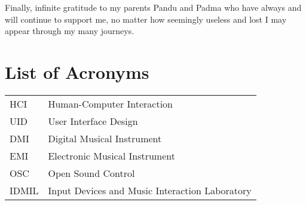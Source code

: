 \documentclass [12pt,letterpaper]{report}
\begin{document}
Finally, infinite gratitude to my parents Pandu and Padma who have always and will continue to support me, no matter how seemingly useless and lost I may appear through my many journeys.

\tableofcontents
\listoffigures
\listoftables

\newpage
\chapter*{List of Acronyms}

\begin{longtable}{ll}
  HCI		&	Human-Computer Interaction\\
  UID		&	User Interface Design\\
  DMI		&	Digital Musical Instrument\\
  EMI		&	Electronic Musical Instrument\\
  OSC	&	Open Sound Control\\
  IDMIL	&	Input Devices and Music Interaction Laboratory\\
\end{longtable}

\cleardoublepage
{}

\typeout{}


\typeout{}


\typeout{}


\typeout{}


\typeout{}


\appendix



\begin{comment}
\typeout{}

\end{comment}

\typeout{}
\begin{singlespace}
  
  
\end{singlespace}
\end{document}

